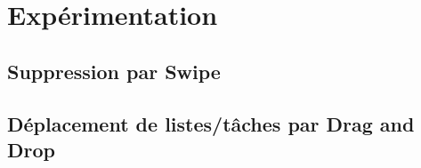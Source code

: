 \documentclass[a4paper,10pt]{article}
\begin{document}
\newpage
\section{Expérimentation}
\label{experimentation}

\subsection{Suppression par Swipe}

\subsection{Déplacement de listes/tâches par Drag and Drop}


\newpage
\end{document}
